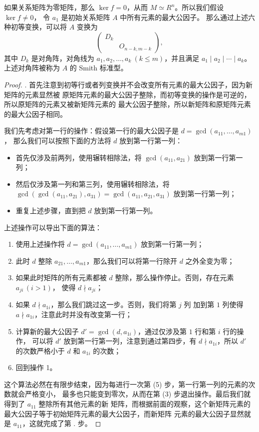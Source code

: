 \documentclass[fontset=none,zihao=-4]{Notes}
\begin{document}
\begin{theorem}\label{thm:Smith form}
  如果关系矩阵为零矩阵，那么 $\ker f=0$，从而
  $M\simeq R^n$。所以我们假设 $\ker f\neq 0$，
  令 $a_1$ 是初始关系矩阵 $A$ 中所有元素的最大公因子。
  那么通过上述六种初等变换，可以将 $A$ 变换为
  \[
    \begin{pmatrix}
      D_k & \\
      & O_{n-k,m-k}
    \end{pmatrix}  ,
  \]
  其中 $D_k$ 是对角阵，对角线为 $a_1,a_2,\dots,a_k\ (k\leq m)$，并且满足
  $a_1\mid a_2\mid\cdots\mid a_k$。上述对角阵被称为 $A$
  的 Smith 标准型。
\end{theorem}
\begin{proof}
  \uppercase\expandafter{}. 
  首先注意到初等行或者列变换并不会改变所有元素的最大公因子，因为新矩阵的元素显然被
  原矩阵元素的最大公因子整除，而初等变换的操作是可逆的，所以原矩阵的元素又被新矩阵元素的
  最大公因子整除，所以新矩阵和原矩阵元素的最大公因子相同。

  我们先考虑对第一行的操作：假设第一行的最大公因子是 $d=\gcd(a_{11},\dots,a_{m1})$，
  那么我们可以按照下面的方法将 $d$ 放到第一行第一列：
  \begin{itemize}[nosep]
    \item 首先仅涉及前两列，使用辗转相除法，将 $\gcd(a_{11},a_{21})$ 放到第一行第一列；
    \item 然后仅涉及第一列和第三列，使用辗转相除法，将 $\gcd(\gcd(a_{11},a_{21}),a_{31})
    =\gcd(a_{11},a_{21},a_{31})$ 放到第一行第一列；
    \item 重复上述步骤，直到把 $d$ 放到第一行第一列。
  \end{itemize}
  上述操作可以导出下面的算法：
  \begin{enumerate}[nosep]
    \item 使用上述操作将 $d=\gcd(a_{11},\dots,a_{m1})$ 放到第一行第一列；
    \item 此时 $d$ 整除 $a_{21},\dots,a_{m1}$，那么我们可以将第一行除开 $d$ 之外全变为零；
    \item 如果此时矩阵的所有元素都被 $d$ 整除，那么操作停止。否则，存在元素 $a_{ji}\,(i>1)$，
    使得 $d\nmid a_{ji}$；
    \item 如果 $d\nmid a_{1i}$，那么我们跳过这一步。否则，我们将第 $j$ 列
    加到第 $1$ 列使得 $a\nmid a_{1i}$，注意此时并没有改变第一行；
    \item 计算新的最大公因子 $d'=\gcd(d,a_{1i})$，通过仅涉及第 $1$ 行和第 $i$ 行的操作，
    可以将 $d'$ 放到第一行第一列，注意到通过第四步，有 $d\nmid a_{1i}$，所以
    $d'$ 的次数严格小于 $d$ 和 $a_{1i}$ 的次数；
    \item 回到操作 1。
  \end{enumerate}
  这个算法必然在有限步结束，因为每进行一次第 (5) 步，第一行第一列的元素的次数就会严格变小，
  最多也只能变到零次，从而在第 (3) 步退出操作。最后我们就得到了 $a_{11}$ 整除所有其他元素的新
  矩阵，而根据前面的观察，这个新矩阵元素的最大公因子等于初始矩阵元素的最大公因子，而新矩阵
  元素的最大公因子显然就是 $a_{11}$，这就完成了第 \uppercase\expandafter{}. 步。


\end{proof}
\end{document}
